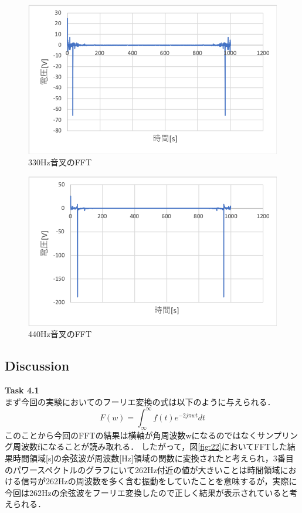 \documentclass[11pt, a4paper,twocolumn]{jarticle}
\begin{document}
\begin{figure}[htbp]
 \begin{center}
  \includegraphics[width=0.8\linewidth]{fig25.png}
 \end{center}
 \caption{330Hz音叉のFFT}
 \label{fig:25}
\end{figure}

\begin{figure}[htbp]
 \begin{center}
  \includegraphics[width=0.8\linewidth]{fig27.png}
 \end{center}
 \caption{440Hz音叉のFFT}
 \label{fig:27}
\end{figure}
\newpage
\subsection{Discussion}
\noindent
\textbf{Task 4.1} \\
まず今回の実験においてのフーリエ変換の式は以下のように与えられる．
\begin{equation}
    F(w) = \int_{\infty}^{\infty}f(t)e^{-2j{\pi}wt}dt
\end{equation}
このことから今回のFFTの結果は横軸が角周波数wになるのではなくサンプリング周波数fになることが読み取れる．
したがって，図\ref{fig:22}においてFFTした結果時間領域[s]の余弦波が周波数[Hz]領域の関数に変換されたと考えられ，3番目のパワースペクトルのグラフにいて262Hz付近の値が大きいことは時間領域における信号が262Hzの周波数を多く含む振動をしていたことを意味するが，実際に今回は262Hzの余弦波をフーリエ変換したので正しく結果が表示されていると考えられる．
\end{document}
